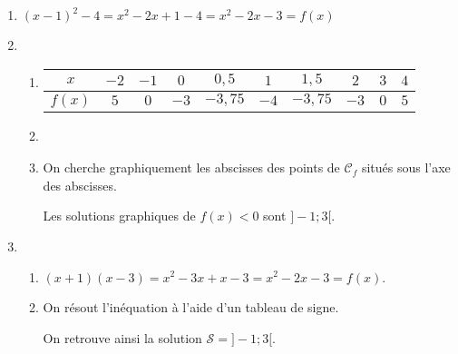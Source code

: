 \documentclass[a4paper]{article}
\begin{document}
  \begin{exercice}{}{}
\begin{enumerate}
  \item $(x-1)^2-4=x^2-2x+1-4=x^2-2x-3=f(x)$
  \item \begin{enumerate}
    \item 
     \begin{tabular}{|*{10}{c|}}
      \hline
     $x$ & $-2$ & $-1$ & $0$ & $0,5$ & $1$ & $1,5$ & $2$ & $3$ & $4$ \\
     \hline
     $f(x)$ & $5$ &$0$ &$-3$ &$-3,75$ & $-4$&  $-3,75$& $-3$& $0$  &$5$ \\
     \hline
    \end{tabular}
    \item 
\begin{center}

\end{center}
\item On cherche graphiquement les abscisses des points de $\mathcal{C}_f$ situés sous l'axe des abscisses.

Les solutions graphiques de $f(x)<0$ sont $]-1;3[$.
\end{enumerate}

\item \begin{enumerate}
  \item $(x+1)(x-3)=x^2-3x+x-3=x^2-2x-3=f(x)$.
  \item On résout l'inéquation à l'aide d'un tableau de signe.
  \begin{center}
  \end{center}
  On retrouve ainsi la solution $\mathcal{S}=]-1;3[$.
\end{enumerate}


\end{enumerate}
\end{exercice}
\end{document}
